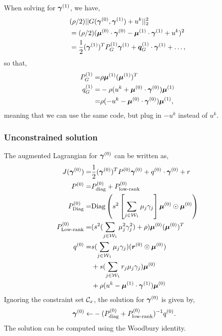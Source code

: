 When solving for $\bm{\gamma}^{(1)}$, we have,
\begin{align}
& (\rho/2)||G(\bm{\gamma}^{(0)},\bm{\gamma}^{(1)}) + u^k||_2^2\\
& = (\rho/2)(\bm{\mu}^{(0)} \cdot \bm{\gamma}^{(0)} - \bm{\mu}^{(1)} \cdot \bm{\gamma}^{(1)} + u^k)^2\\
& = \frac{1}{2} (\bm{\gamma}^{(1)})^T P^{(1)}_G \bm{\gamma}^{(1)} + \bm{q}^{(1)}_G \cdot \bm{\gamma}^{(1)} + \ldots,
\end{align}
so that,
\begin{align}
P^{(1)}_G = & \rho \bm{\mu}^{(1)} (\bm{\mu}^{(1)})^T\\
q^{(1)}_G = & -\rho(u^k + \bm{\mu}^{(0)} \cdot \bm{\gamma}^{(0)})\bm{\mu}^{(1)}\\
= & \rho(-u^k - \bm{\mu}^{(0)} \cdot \bm{\gamma}^{(0)})\bm{\mu}^{(1)},
\end{align}
meaning that we can use the same code, but plug in $-u^k$ instead of $u^k$.

\newcommand{\Px}{\ensuremath P^{(0)}}
\newcommand{\qx}{\ensuremath q^{(0)}}
\newcommand{\Pz}{\ensuremath P^{(1)}}
\newcommand{\qz}{\ensuremath q^{(1)}}

\subsubsection{Unconstrained solution}
The augmented Lagrangian for $\bm{\gamma}^{(0)}$ can be written as,
\begin{align}
J(\vgx) = & \frac{1}{2} (\vgx)^T \Px \vgx + \qx \cdot \vgx + r
\label{eq:augmented-lagrangian}
\\
\Px = & \Px_{\text{diag}} + \Px_{\text{low-rank}}\\
\Px_{\text{Diag}} = & \text{Diag}\left(s^2 \left[ \sum_{\jinlex} \mu_j \gamma_j \right] \vmx \odot \vmx\right)\\
\Px_{\text{Low-rank}} = & (s^2 (\sum_{\jinlex} \mu_j^2 \gamma_j^2)  + \rho) \vmx (\vmx)^T \\
\notag
\qx = & s (\sum_{\jinlex} \mu_j \gamma_j) (\vec{r}^{(0)} \odot \vmx) \\
\notag  & + s (\sum_{\jinlex} r_j \mu_j \gamma_j) \vmx \\
& + \rho (u^k - \vmz \cdot \vgz ) \vmx
\end{align}
Ignoring the constraint set $\mathcal{C}_x$, the solution for $\bm{\gamma}^{(0)}$ is given by,
\begin{align}
\vg^{(0)} \gets & -(\Px_{\text{diag}} + \Px_{\text{low-rank}})^{-1} \qx.
\label{eq:unconstrained-solution}
\end{align}
The solution can be computed using the Woodbury identity.

